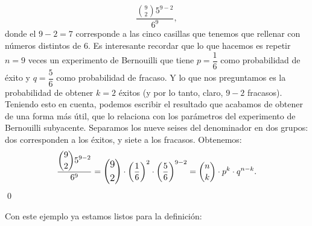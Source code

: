 \begin{itemize}
\begin{Ejemplo}
             \[\dfrac{\displaystyle\binom{9}{2}5^{9-2}}{6^9},\]
             donde el $9-2=7$ corresponde a las cinco casillas que tenemos que rellenar con números distintos de $6$. Es interesante recordar que lo que hacemos es repetir $n=9$ veces un experimento de Bernouilli que tiene $p=\dfrac{1}{6}$ como probabilidad de éxito y $q=\dfrac{5}{6}$ como probabilidad de fracaso. Y lo que nos preguntamos es la probabilidad de obtener $k=2$ éxitos (y por lo tanto, claro, $9-2$ fracasos). Teniendo esto en cuenta, podemos escribir el resultado que acabamos de obtener de una forma más útil, que lo relaciona con los parámetros del experimento de Bernouilli subyacente. Separamos los nueve seises del denominador en dos grupos: dos corresponden a los éxitos, y siete a los fracasos. Obtenemos:
             \[\dfrac{\displaystyle\binom{9}{2}5^{9-2}}{6^9}=
             \mbox{\large $ \displaystyle\binom{9}{2}$}\cdot\left(\dfrac{1}{6}\right)^2\cdot\left(\dfrac{5}{6}\right)^{9-2}=
             \binom{n}{k}\cdot p^k\cdot q^{n-k}.
             \]
             \quad\qed
             \end{Ejemplo}

             Con este ejemplo ya estamos listos para la definición:\\[3mm]
           \\[3mm]


\end{itemize}
